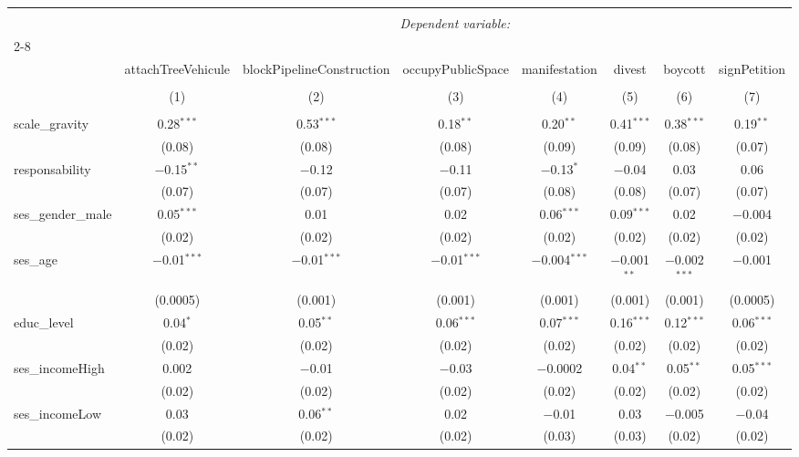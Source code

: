 \documentclass[
]{article}
\begin{document}
\begin{sidewaystable}[!htbp] \centering 
  \caption{Interaction responsabilité des citoyens-préoccupations 2} 
  \label{} 
\begin{tabular}{@{\extracolsep{1pt}}lccccccc} 
\\[-1.8ex]\hline 
\hline \\[-1.8ex] 
 & \multicolumn{7}{c}{\textit{Dependent variable:}} \\ 
\cline{2-8} 
\\[-1.8ex] & attachTreeVehicule & blockPipelineConstruction & occupyPublicSpace & manifestation & divest & boycott & signPetition \\ 
\\[-1.8ex] & (1) & (2) & (3) & (4) & (5) & (6) & (7)\\ 
\hline \\[-1.8ex] 
 scale\_gravity & 0.28$^{***}$ & 0.53$^{***}$ & 0.18$^{**}$ & 0.20$^{**}$ & 0.41$^{***}$ & 0.38$^{***}$ & 0.19$^{**}$ \\ 
  & (0.08) & (0.08) & (0.08) & (0.09) & (0.09) & (0.08) & (0.07) \\ 
  responsability & $-$0.15$^{**}$ & $-$0.12 & $-$0.11 & $-$0.13$^{*}$ & $-$0.04 & 0.03 & 0.06 \\ 
  & (0.07) & (0.07) & (0.07) & (0.08) & (0.08) & (0.07) & (0.07) \\ 
  ses\_gender\_male & 0.05$^{***}$ & 0.01 & 0.02 & 0.06$^{***}$ & 0.09$^{***}$ & 0.02 & $-$0.004 \\ 
  & (0.02) & (0.02) & (0.02) & (0.02) & (0.02) & (0.02) & (0.02) \\ 
  ses\_age & $-$0.01$^{***}$ & $-$0.01$^{***}$ & $-$0.01$^{***}$ & $-$0.004$^{***}$ & $-$0.001$^{**}$ & $-$0.002$^{***}$ & $-$0.001 \\ 
  & (0.0005) & (0.001) & (0.001) & (0.001) & (0.001) & (0.001) & (0.0005) \\ 
  educ\_level & 0.04$^{*}$ & 0.05$^{**}$ & 0.06$^{***}$ & 0.07$^{***}$ & 0.16$^{***}$ & 0.12$^{***}$ & 0.06$^{***}$ \\ 
  & (0.02) & (0.02) & (0.02) & (0.02) & (0.02) & (0.02) & (0.02) \\ 
  ses\_incomeHigh & 0.002 & $-$0.01 & $-$0.03 & $-$0.0002 & 0.04$^{**}$ & 0.05$^{**}$ & 0.05$^{***}$ \\ 
  & (0.02) & (0.02) & (0.02) & (0.02) & (0.02) & (0.02) & (0.02) \\ 
  ses\_incomeLow & 0.03 & 0.06$^{**}$ & 0.02 & $-$0.01 & 0.03 & $-$0.005 & $-$0.04 \\ 
  & (0.02) & (0.02) & (0.02) & (0.03) & (0.03) & (0.02) & (0.02) \\ 

\end{tabular}
\end{sidewaystable}
\end{document}
